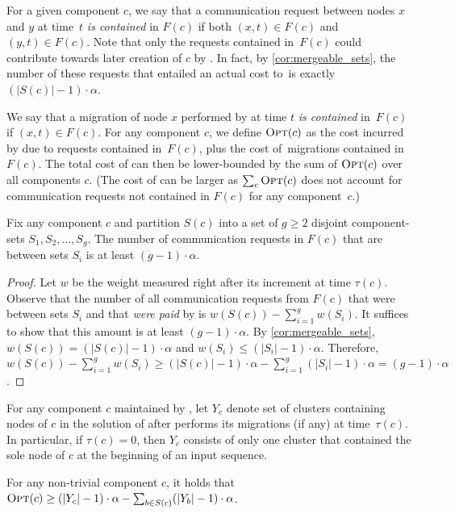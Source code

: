 For a given component $c$, we say that a communication request between nodes
$x$ and $y$ at time~$t$ \emph{is contained} in $F(c)$ if both $(x,t) \in F(c)$
and $(y,t) \in F(c)$. Note that only the requests contained in~$F(c)$
could contribute towards later creation of $c$ by \CREP. In fact, by
\ref{cor:mergeable_sets}, the number of these requests that
entailed an actual cost to~\CREP is exactly $(|S(c)| - 1) \cdot \alpha$.

We say that a migration of node $x$ performed by \OPT at time $t$ \emph{is
contained} in~$F(c)$ if $(x,t) \in F(c)$. For any component $c$, we define
$\textsc{Opt}(c)$ as the cost incurred by \OPT due to requests contained in~$F(c)$, 
plus the cost of~\OPT migrations contained in~$F(c)$. The total cost of \OPT
can then be lower-bounded by the sum of $\textsc{Opt}(c)$ over all components $c$.
(The cost of \OPT can be larger as $\sum_c \textsc{Opt}(c)$ does not account for 
communication requests not contained in $F(c)$ for any component~$c$.)

\begin{lemma}
\label{lem:merge_action_cut}
Fix any component $c$ and partition $S(c)$ into a set of $g \geq 2$ disjoint
component-sets $S_1, S_2, \ldots, S_g$. The number of communication requests
in $F(c)$ that are between sets $S_i$ is at least $(g-1) \cdot \alpha$.
\end{lemma}
\begin{proof}
Let $w$ be the weight measured right after its increment at time $\tau(c)$.
Observe that the number of all communication requests from $F(c)$ that were
between sets $S_i$ and that \emph{were paid} by \CREP is $w(S(c)) -
\sum_{i=1}^g w(S_i)$. It suffices to show that this amount is at least $(g-1)
\cdot \alpha$. By \ref{cor:mergeable_sets}, $w(S(c)) = (|S(c)|-1)
\cdot \alpha$ and $w(S_i) \leq (|S_i|-1) \cdot \alpha$. Therefore, $w(S(c)) -
\sum_{i=1}^g w(S_i) \geq (|S(c)|-1) \cdot \alpha - \sum_{i=1}^g (|S_i|-1)
\cdot \alpha = (g-1) \cdot \alpha$.
\end{proof}

For any component $c$ maintained by \CREP, let $Y_c$ denote set of clusters
containing nodes of $c$ in the solution of \OPT after \OPT performs its
migrations (if any) at time~$\tau(c)$. In particular, if $\tau(c) = 0$, then
$Y_c$ consists of only one cluster that contained the sole node of $c$ 
at the beginning of an input sequence.

\begin{lemma}
\label{lem:opt_recursive_bound}
For any non-trivial component $c$, it holds that $\textsc{Opt}(c) \geq (|Y_c| - 1)
\cdot \alpha - \sum_{b \in S(c)} (|Y_b| - 1) \cdot \alpha$.
\end{lemma}


